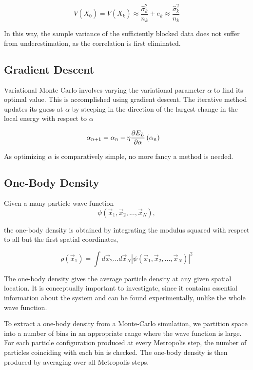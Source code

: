 \begin{equation}\label{eq:trunc}
V(\bar{X}_0) = V(\bar{X}_k) \approx \frac{\hat{\sigma}_k^2}{n_k} +  e_k \approx \frac{\hat{\sigma}_k^2}{n_k}
\end{equation}

In this way, the sample variance of the sufficiently blocked data does not suffer from underestimation, as the correlation is first eliminated. 
  

\subsection{Gradient Descent}
Variational Monte Carlo involves varying the variational parameter \(\alpha\)
to find its optimal value. This is accomplished using gradient descent. The
iterative method updates its guess at \(\alpha\) by steeping in the direction of
the largest change in the local energy with respect to \(\alpha\)

\begin{align*}
  \alpha_{n+1} &= \alpha_{n} - \eta\pdv{E_{L}}{\alpha}\left( \alpha_{n} \right)
\end{align*}

As optimizing \(\alpha\) is comparatively simple, no more fancy a method is
needed.

\subsection{One-Body Density}
Given a many-particle wave function 
\begin{equation}
	\psi(\vec{x}_1, \vec{x}_2, ..., \vec{x}_N),
\end{equation}

the one-body density is obtained by integrating the modulus squared with respect to all but the first spatial coordinates,

\begin{equation}
	\rho(\vec{x}_1) = \int d \vec{x}_2... d \vec{x}_N|\psi(\vec{x}_1, \vec{x}_2, ..., \vec{x}_N)|^2
\end{equation}

The one-body density gives the average particle density at any given spatial location. It is conceptually important to investigate, since it contains essential information about the system and can be found experimentally, unlike the whole wave function.

To extract a one-body density from a Monte-Carlo simulation, we partition space into a number of bins in an appropriate range where the wave function is large. For each particle configuration produced at every Metropolis step, the number of particles coinciding with each bin is checked. The one-body density is then produced by averaging over all Metropolis steps. 


